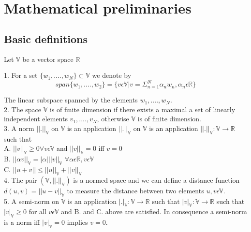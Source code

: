 \documentclass[a4paper,10pt]{book}
\begin{document}
\section{Mathematical preliminaries}

\subsection{Basic definitions}\cite{crbm}

Let $\mathbb{V}$ be a vector space $\mathbb{R}$

1. For a set $\lbrace w_1,....,w_N \rbrace \subset \mathbb{V}$ we denote by \\
\begin{equation} \label{vector space}
span \lbrace w_1,....,w_2 \rbrace = \lbrace v \epsilon \mathbb{V} | v = \Sigma_{n=1}^N \alpha_n w_n, \alpha_n \epsilon \mathbb{R} \rbrace
\end{equation} 

The linear subspace spanned by the elements $w_1,....,w_N$.\\

2. The space $\mathbb{V}$ is of finite dimension if there exists a maximal a set of linearly independent elements $v_1,....,v_N$, otherwise $\mathbb{V}$ is of finite dimension.\\

3. A norm $||.||_\mathbb{V}$ on $\mathbb{V}$ is an application $||.||_\mathbb{V}$ on $\mathbb{V}$ is an application $||.||_\mathbb{V} : \mathbb{V} \rightarrow \mathbb{R}$ such that\\ 
A. $||v||_\mathbb{V} \geq 0 \forall v \epsilon \mathbb{V}$ and $||v||_\mathbb{V} = 0$ iff $v=0$\\
B. $||\alpha v||_\mathbb{V} = |\alpha| ||v||_\mathbb{V}$  $\forall \alpha \epsilon \mathbb{R}, v \epsilon \mathbb{V}$\\
C. $||u+v|| \leq ||u||_\mathbb{V} + ||v||_\mathbb{V}$\\

4. The pair $(\mathbb{V},||.||_\mathbb{V})$ is a normed space and we can define a distance function $d(u,v) = ||u-v||_\mathbb{V}$ to measure the distance between two elements $u,v \epsilon \mathbb{V}$.\\

5. A semi-norm on $\mathbb{V}$ is an application $|.|_\mathbb{V} : \mathbb{V} \rightarrow \mathbb{R}$ such that $|v|_\mathbb{V} : \mathbb{V} \rightarrow \mathbb{R}$ such that $|v|_\mathbb{V} \geq 0$ for all $v \epsilon \mathbb{V}$ and B. and C. above are satisfied. In consequence a semi-norm is a norm iff $|v|_\mathbb{V} = 0$ implies  $v = 0$.\\
\end{document}
